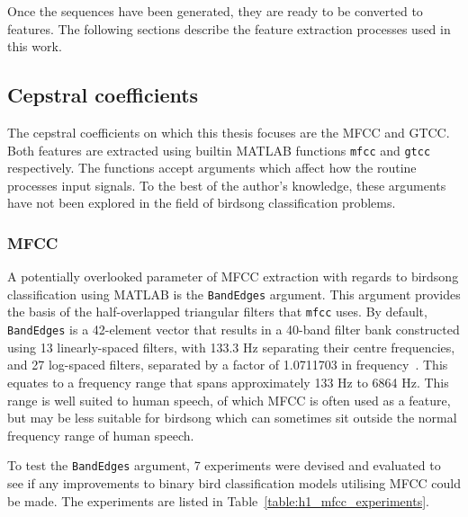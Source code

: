 Once the sequences have been generated, they are ready to be converted to
features. The following sections describe the feature extraction processes used
in this work.

\subsection{Cepstral coefficients}

The cepstral coefficients on which this thesis focuses are the MFCC and GTCC\@.
Both features are extracted using builtin MATLAB functions
\texttt{mfcc} and \texttt{gtcc} respectively. The functions accept arguments
which affect how the routine processes input signals. To the best of the
author's knowledge, these arguments have not been explored in the field of
birdsong classification problems.

\subsubsection{MFCC}\label{sssec:mfcc}

A potentially overlooked parameter of MFCC extraction with regards to birdsong
classification using MATLAB is the \texttt{BandEdges} argument. This
argument provides the basis of the half-overlapped triangular filters that
\texttt{mfcc} uses. By default, \texttt{BandEdges} is a 42-element vector that
results in a 40-band filter bank constructed using 13 linearly-spaced filters,
with 133.3 Hz separating their centre frequencies, and 27 log-spaced filters,
separated by a factor of 1.0711703 in frequency~\cite{slaney1998auditory}. This
equates to a frequency range that spans approximately 133 Hz to 6864 Hz. This
range is well suited to human speech, of which MFCC is often used as a feature,
but may be less suitable for birdsong which can sometimes sit outside the normal
frequency range of human speech.

To test the \texttt{BandEdges} argument, 7 experiments were devised and
evaluated to see if any improvements to binary bird classification
models utilising MFCC could be made. The experiments are listed in
Table~\ref{table:h1_mfcc_experiments}.

